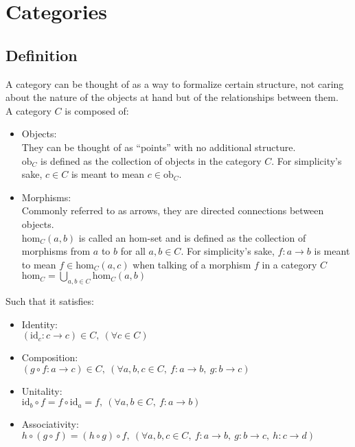 \section{Categories}

\subsection{Definition}
A category can be thought of as a way to formalize certain structure, not caring
about the nature of the objects at hand but of the relationships between them.\\
A category $C$ is composed of: \parencite{fong:7sketches}
\begin{itemize}
  \item Objects:\\
    They can be thought of as ``points'' with no additional structure.\\
    $\mathrm{ob}_C$ is defined as the collection of objects in the category $C$.
    For simplicity's sake, $c\in C$ is meant to mean $c\in \mathrm{ob}_C$.
  \item Morphisms:\\
    Commonly referred to as arrows, they are directed connections between
    objects.\\
    $\mathrm{hom}_C(a, b)$ is called an hom-set and is defined as the collection
    of morphisms from $a$ to $b$ for all $a,b\in C$. For simplicity's sake, $f:
    a \to b$ is meant to mean $f \in \mathrm{hom}_C(a,c)$ when talking of a
    morphism $f$ in a category $C$\\
    $\mathrm{hom}_C = \bigcup\limits_{a,b\in C} \mathrm{hom}_C(a,b)$
\end{itemize}

Such that it satisfies:
\begin{itemize}
  \item Identity:\\
    $(\mathrm{id}_c: c \to c) \in C,\ (\forall c \in C)$
  \item Composition:\\
    $(g \circ f : a \to c) \in C,
      \ (\forall a, b, c \in C,\ f: a \to b,\ g:b \to c)$
  \item Unitality:\\
    $\mathrm{id}_b \circ f = f \circ \mathrm{id}_a = f,
      \ (\forall a, b \in C,\ f: a \to b)$
  \item Associativity:\\
    $h \circ (g \circ f) = (h \circ g) \circ f,
      \ (\forall a,b,c\in C,\ f:a\to b,\ g:b\to c,\ h:c\to d)$
\end{itemize}

